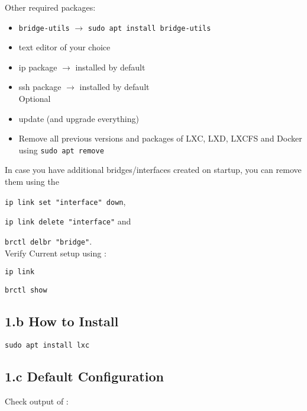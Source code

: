 \documentclass{report}
\begin{document}


		

Other required packages:
\begin{itemize}
\item \texttt{bridge-utils} $\rightarrow$ \texttt{sudo apt install bridge-utils}
\item text editor of your choice 
\item ip package $\rightarrow$ installed by default
\item ssh package $\rightarrow$ installed by default \\
Optional
\item update (and upgrade everything)
\item Remove all previous versions and packages of LXC, LXD, LXCFS and Docker using \texttt{sudo apt remove} \\
\end{itemize} 
In case you have additional bridges/interfaces created on startup, you can remove them using the 

\texttt{ip link set "interface" down}, 

\texttt{ip link delete "interface"} and  

\texttt{brctl delbr "bridge"}. \\
Verify Current setup using :

\texttt{ip link} 

\texttt{brctl show} 
		
\subsection*{1.b How to Install}

\texttt{sudo apt install lxc}

\subsection*{1.c Default Configuration}

Check output of : 
\end{document}
